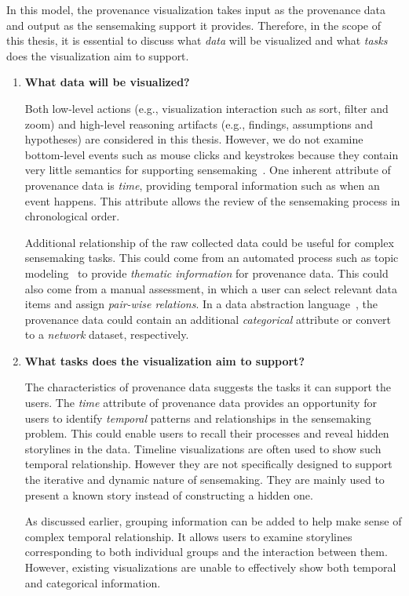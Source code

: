 In this model, the provenance visualization takes input as the provenance data and output as the sensemaking support it provides. Therefore, in the scope of this thesis, it is essential to discuss what \emph{data} will be visualized and what \emph{tasks} does the visualization aim to support.

\begin{enumerate}
	\item \textbf{What data will be visualized?}
	
	Both low-level actions (e.g., visualization interaction such as sort, filter and zoom) and high-level reasoning artifacts (e.g., findings, assumptions and hypotheses) are considered in this thesis. However, we do not examine bottom-level events such as mouse clicks and keystrokes because they contain very little semantics for supporting sensemaking~\cite{Gotz2009}. One inherent attribute of provenance data is \emph{time}, providing temporal information such as when an event happens. This attribute allows the review of the sensemaking process in chronological order.
	
	Additional relationship of the raw collected data could be useful for complex sensemaking tasks. This could come from an automated process such as topic modeling~\cite{Blei2003} to provide \emph{thematic information} for provenance data. This could also come from a manual assessment, in which a user can select relevant data items and assign \emph{pair-wise relations}. In a data abstraction language~\cite{Munzner2014}, the provenance data could contain an additional \emph{categorical} attribute or convert to a \emph{network} dataset, respectively.
	
	\item \textbf{What tasks does the visualization aim to support?}
	
	The characteristics of provenance data suggests the tasks it can support the users. The \emph{time} attribute of provenance data provides an opportunity for users to identify \emph{temporal} patterns and relationships in the sensemaking problem. This could enable users to recall their processes and reveal hidden storylines in the data. Timeline visualizations are often used to show such temporal relationship. However they are not specifically designed to support the iterative and dynamic nature of sensemaking. They are mainly used to present a known story instead of constructing a hidden one.
	
	As discussed earlier, grouping information can be added to help make sense of complex temporal relationship. It allows users to examine storylines corresponding to both individual groups and the interaction between them. However, existing visualizations are unable to effectively show both temporal and categorical information.
	

\end{enumerate}
